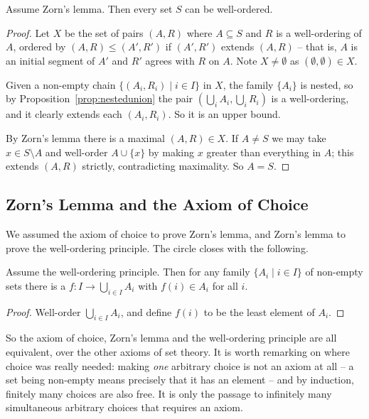 \begin{theorem}\label{thm:wop}
  Assume Zorn's lemma. Then every set $S$ can be well-ordered.
\end{theorem}
\begin{proof}
  Let $X$ be the set of pairs $(A, R)$ where $A \subseteq S$ and $R$ is a well-ordering of $A$, ordered by $(A, R) \leq (A', R')$ if $(A', R')$ extends $(A, R)$ -- that is, $A$ is an initial segment of $A'$ and $R'$ agrees with $R$ on $A$. Note $X \neq \emptyset$ as $(\emptyset, \emptyset) \in X$.

  Given a non-empty chain $\{(A_i, R_i) \mid i \in I\}$ in $X$, the family $\{A_i\}$ is nested, so by Proposition~\ref{prop:nestedunion} the pair $(\bigcup_i A_i, \bigcup_i R_i)$ is a well-ordering, and it clearly extends each $(A_i, R_i)$. So it is an upper bound.

  By Zorn's lemma there is a maximal $(A, R) \in X$. If $A \neq S$ we may take $x \in S \setminus A$ and well-order $A \cup \{x\}$ by making $x$ greater than everything in $A$; this extends $(A, R)$ strictly, contradicting maximality. So $A = S$.
\end{proof}

\subsection{Zorn's Lemma and the Axiom of Choice}

We assumed the axiom of choice to prove Zorn's lemma, and Zorn's lemma to prove the well-ordering principle. The circle closes with the following.

\begin{theorem}
  Assume the well-ordering principle. Then for any family $\{A_i \mid i \in I\}$ of non-empty sets there is a  $f: I \rightarrow \bigcup_{i \in I} A_i$ with $f(i) \in A_i$ for all $i$.
\end{theorem}
\begin{proof}
  Well-order $\bigcup_{i \in I} A_i$, and define $f(i)$ to be the least element of $A_i$.
\end{proof}

So the axiom of choice, Zorn's lemma and the well-ordering principle are all equivalent, over the other axioms of set theory. It is worth remarking on where choice was really needed: making \emph{one} arbitrary choice is not an axiom at all -- a set being non-empty means precisely that it has an element -- and by induction, finitely many choices are also free. It is only the passage to infinitely many simultaneous arbitrary choices that requires an axiom.

